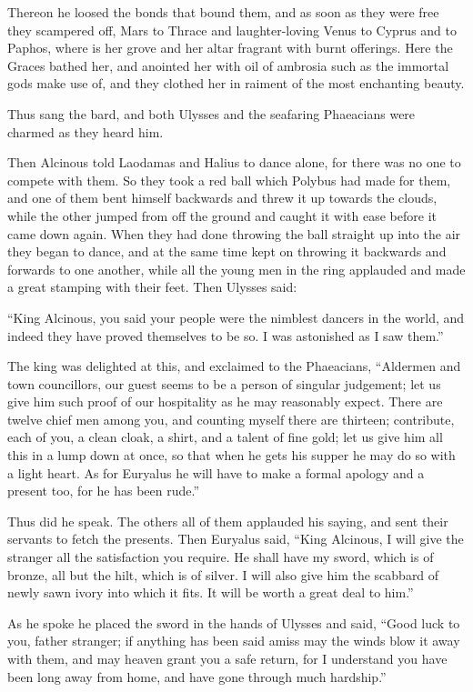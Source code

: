 Thereon he loosed the bonds that bound them, and as soon as they were free they
scampered off, Mars to Thrace and laughter-loving Venus to Cyprus and to
Paphos, where is her grove and her altar fragrant with burnt offerings. Here
the Graces bathed her, and anointed her with oil of ambrosia such as the
immortal gods make use of, and they clothed her in raiment of the most
enchanting beauty.

Thus sang the bard, and both Ulysses and the seafaring Phaeacians were charmed
as they heard him.

Then Alcinous told Laodamas and Halius to dance alone, for there was no one to
compete with them. So they took a red ball which Polybus had made for them, and
one of them bent himself backwards and threw it up towards the clouds, while
the other jumped from off the ground and caught it with ease before it came
down again. When they had done throwing the ball straight up into the air they
began to dance, and at the same time kept on throwing it backwards and forwards
to one another, while all the young men in the ring applauded and made a great
stamping with their feet. Then Ulysses said:

“King Alcinous, you said your people were the nimblest dancers in the world,
and indeed they have proved themselves to be so. I was astonished as I saw
them.”

The king was delighted at this, and exclaimed to the Phaeacians, “Aldermen and
town councillors, our guest seems to be a person of singular judgement; let us
give him such proof of our hospitality as he may reasonably expect. There are
twelve chief men among you, and counting myself there are thirteen; contribute,
each of you, a clean cloak, a shirt, and a talent of fine gold; let us give him
all this in a lump down at once, so that when he gets his supper he may do so
with a light heart. As for Euryalus he will have to make a formal apology and a
present too, for he has been rude.”

Thus did he speak. The others all of them applauded his saying, and sent their
servants to fetch the presents. Then Euryalus said, “King Alcinous, I will give
the stranger all the satisfaction you require. He shall have my sword, which is
of bronze, all but the hilt, which is of silver. I will also give him the
scabbard of newly sawn ivory into which it fits. It will be worth a great deal
to him.”

As he spoke he placed the sword in the hands of Ulysses and said, “Good luck to
you, father stranger; if anything has been said amiss may the winds blow it
away with them, and may heaven grant you a safe return, for I understand you
have been long away from home, and have gone through much hardship.”

